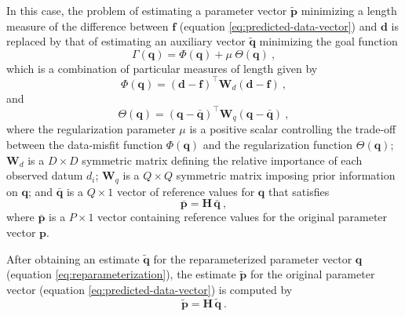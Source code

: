 In this case, the problem of estimating a parameter vector $\tilde{\mathbf{p}}$ minimizing a length 
measure of the difference between $\mathbf{f}$ (equation \ref{eq:predicted-data-vector}) and $\mathbf{d}$
is replaced by that of estimating an auxiliary vector $\tilde{\mathbf{q}}$ minimizing the goal function
\begin{equation}
	\Gamma(\mathbf{q}) = \Phi(\mathbf{q}) + \mu \: \Theta(\mathbf{q}) \: ,
	\label{eq:function-Gamma}
\end{equation}
which is a combination of particular measures of length given by
\begin{equation}
	\Phi(\mathbf{q}) = \left( \mathbf{d} - \mathbf{f} \right)^{\top}\mathbf{W}_{d}\left( \mathbf{d} - \mathbf{f} \right) \: ,
	\label{eq:function-Phi}
\end{equation}
and
\begin{equation}
	\Theta(\mathbf{q}) = \left( \mathbf{q} - \bar{\mathbf{q}} \right)^{\top}\mathbf{W}_{q}\left( \mathbf{q} - \bar{\mathbf{q}} \right) \: ,
	\label{eq:function-Theta}
\end{equation}
where the regularization parameter $\mu$ is a positive scalar controlling the trade-off between the data-misfit function 
$\Phi(\mathbf{q})$ and the regularization function $\Theta(\mathbf{q})$; 
$\mathbf{W}_{d}$ is a $D \times D$ symmetric matrix defining the relative importance of each observed datum $d_{i}$;
$\mathbf{W}_{q}$ is a $Q \times Q$ symmetric matrix imposing prior information on $\mathbf{q}$;
and $\bar{\mathbf{q}}$ is a $Q \times 1$ vector of reference values for $\mathbf{q}$ that satisfies
\begin{equation}
	\bar{\mathbf{p}} = \mathbf{H} \, \bar{\mathbf{q}} \: ,
	\label{eq:reparameterization-reference}
\end{equation}
where $\bar{\mathbf{p}}$ is a $P \times 1$ vector containing reference values
for the original parameter vector $\mathbf{p}$.

After obtaining an estimate $\tilde{\mathbf{q}}$ for the reparameterized parameter vector $\mathbf{q}$ (equation \ref{eq:reparameterization}), 
the estimate $\tilde{\mathbf{p}}$ for the original parameter vector 
(equation \ref{eq:predicted-data-vector}) is computed by 
\begin{equation}
	\tilde{\mathbf{p}} = \mathbf{H} \, \tilde{\mathbf{q}} \: .
	\label{eq:vector-p-tilde}
\end{equation}

